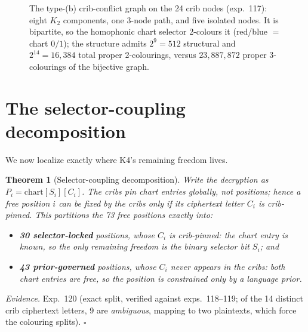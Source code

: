 \documentclass[11pt]{article}
\theoremstyle{plain}
\newtheorem{theorem}{Theorem}
\theoremstyle{definition}
\newcommand{\K}{\textsf{K4}}
\begin{document}
\begin{figure}[t]\centering
{}
\caption{The type-(b) crib-conflict graph on the 24 crib nodes (exp.~117): eight
$K_2$ components, one 3-node path, and five isolated nodes. It is bipartite, so the
homophonic chart selector 2-colours it (red/blue $=$ chart $0/1$); the structure
admits $2^{9}{=}512$ structural and $2^{14}{=}16{,}384$ total proper 2-colourings,
versus $23{,}887{,}872$ proper 3-colourings of the bijective graph.}
\label{fig:bgraph}
\end{figure}

\section{The selector-coupling decomposition}\label{sec:decomp}

We now localize exactly where \K{}'s remaining freedom lives.

\begin{theorem}[Selector-coupling decomposition]\label{thm:decomp}
Write the decryption as $P_i=\mathrm{chart}[S_i][C_i]$. The cribs pin chart
\emph{entries} globally, not positions; hence a free position $i$ can be fixed by the
cribs only if its ciphertext letter $C_i$ is crib-pinned. This partitions the 73 free
positions exactly into:
\begin{itemize}[leftmargin=1.4em,itemsep=1pt]
\item \textbf{30 selector-locked} positions, whose $C_i$ is crib-pinned: the chart
entry is known, so the only remaining freedom is the binary selector bit $S_i$; and
\item \textbf{43 prior-governed} positions, whose $C_i$ never appears in the cribs:
both chart entries are free, so the position is constrained only by a language prior.
\end{itemize}
\end{theorem}
\noindent\emph{Evidence.} Exp.~120 (exact split, verified against exps.~118--119;
of the 14 distinct crib ciphertext letters, 9 are \emph{ambiguous}, mapping to two
plaintexts, which force the colouring splits). \hfill$\square$
\end{document}
